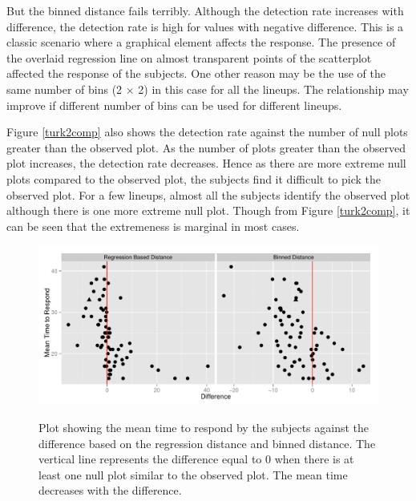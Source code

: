 \documentclass[12]{article}
\begin{document}
But the binned distance fails terribly. Although the detection rate increases with difference, the detection rate is high for values with negative difference. This is a classic scenario where a graphical element affects the response. The presence of the overlaid regression line on almost transparent points of the scatterplot affected the response of the subjects. One other reason may be the use of the same number of bins (2 $\times$ 2) in this case for all the lineups. The relationship may improve if different number of bins can be used for different lineups.

Figure \ref{turk2comp} also shows the detection rate against the number of null plots greater than the observed plot. As the number of plots greater than the observed plot increases, the detection rate decreases.  Hence as there are more extreme null plots compared to the observed plot, the subjects find it difficult to pick the observed plot. For a few lineups, almost all the subjects identify the observed plot although there is one more extreme null plot. Though from Figure \ref{turk2comp}, it can be seen that the extremeness is marginal in most cases. 

\begin{figure}[hbtp]
\centering
\includegraphics[scale=0.75]{turk2-mtime-reg-bin.pdf}
\label{turk2-mtime}
	\vspace{-.1in}
\caption[Optional caption for list of figures]{Plot showing the mean time to respond by the subjects against the difference based on the regression distance and binned distance. The vertical line represents the difference equal to 0 when there is at least one null plot similar to the observed plot. The mean time decreases with the difference.  }
\end{figure}
\end{document}
